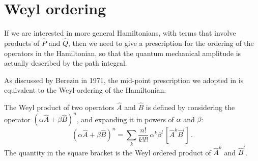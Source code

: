 \section{Weyl ordering}
\label{sec:weyl-ordering}

If we are interested in more general Hamiltonians, with terms that
involve products of $\hat{P}$ and $\hat{Q}$, then we need to give a
prescription for the ordering of the operators in the Hamiltonian, so
that the quantum mechanical amplitude is actually described by the
path integral. 

As discussed by Berezin in 1971, the mid-point prescription we adopted
in  is equivalent to the Weyl-ordering of the
Hamiltonian. 

The Weyl product of two operators $\hat{A}$ and $\hat{B}$ is defined
by considering the operator $\left(\alpha \hat{A} + \beta
  \hat{B}\right)^n$, and expanding it in powers of $\alpha$ and $\beta$: 
\begin{equation}
  \label{eq:WeylOrder}
  \left(\alpha \hat{A} + \beta
    \hat{B}\right)^n = \sum_k \frac{n!}{k! l!}\, 
  \alpha^k \beta^l\, \left[\hat{A}^k
    \hat{B}^l\right]\, .
\end{equation}
The quantity in the square bracket is the Weyl ordered product of
$\hat{A}^k$ and $\hat{B}^l$. 

